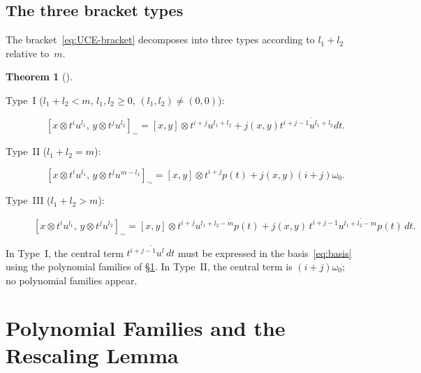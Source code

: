 \documentclass[12pt]{article}
\theoremstyle{plain}
\newtheorem{theorem}{Theorem}[section]
\theoremstyle{definition}
\theoremstyle{remark}
\newcommand{\Kill}[2]{(#1,#2)}
\begin{document}
\subsection{The three bracket types}
The bracket~\eqref{eq:UCE-bracket} decomposes into three types
according to $l_1+l_2$ relative to~$m$.
\begin{theorem}[{\cite[Thm.~1.3]{SNF-I}}]\label{thm:bracket-types}
  \begin{description}
    \item[\textup{Type~I} ($l_1+l_2<m$, $l_1,l_2\geq 0$, $(l_1,l_2)\neq(0,0)$):]
      \begin{equation}\label{eq:TypeI}
        [x\otimes t^i u^{l_1},\,y\otimes t^j u^{l_2}]_\sim
        = [x,y]\otimes t^{i+j}u^{l_1+l_2}
          + j\Kill{x}{y}\overline{t^{i+j-1}u^{l_1+l_2}dt}.
      \end{equation}
    \item[\textup{Type~II} ($l_1+l_2=m$):]
      \begin{equation}\label{eq:TypeII}
        [x\otimes t^i u^{l_1},\,y\otimes t^j u^{m-l_1}]_\sim
        = [x,y]\otimes t^{i+j}p(t) + j\Kill{x}{y}(i+j)\omega_0.
      \end{equation}
    \item[\textup{Type~III} ($l_1+l_2>m$):]
      \begin{equation}\label{eq:TypeIII}
        [x\otimes t^i u^{l_1},\,y\otimes t^j u^{l_2}]_\sim
        = [x,y]\otimes t^{i+j}u^{l_1+l_2-m}p(t)
          + j\Kill{x}{y}\,\overline{t^{i+j-1}u^{l_1+l_2-m}p(t)\,dt}.
      \end{equation}
  \end{description}
\end{theorem}
In Type~I, the central term $\overline{t^{i+j-1}u^l\,dt}$ must be expressed
in the basis~\eqref{eq:basis} using the polynomial families of \S\ref{sec:poly}.
In Type~II, the central term is $(i+j)\omega_0$; no polynomial families appear.
\section{Polynomial Families and the Rescaling Lemma}\label{sec:poly}
\end{document}
